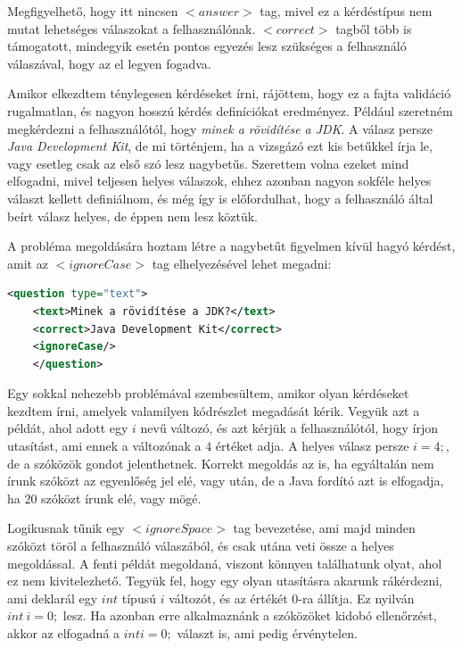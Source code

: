 \documentclass[12pt,a4paper]{article}
\begin{document}
	\noindent
	Megfigyelhető, hogy itt nincsen $<answer>$ tag, mivel ez a kérdéstípus nem mutat lehetséges válaszokat a felhasználónak. $<correct>$ tagből több is támogatott, mindegyik esetén pontos egyezés lesz szükséges a felhasználó válaszával, hogy az el legyen fogadva.
	
	Amikor elkezdtem ténylegesen kérdéseket írni, rájöttem, hogy ez a fajta validáció rugalmatlan, és nagyon hosszú kérdés definíciókat eredményez. Például szeretném megkérdezni a felhasználótól, hogy \textit{minek a rövidítése a JDK}. A válasz persze \textit{Java Development Kit}, de mi történjem, ha a vizsgázó ezt kis betűkkel írja le, vagy esetleg csak az első szó lesz nagybetűs. Szerettem volna ezeket mind elfogadni, mivel teljesen helyes válaszok, ehhez azonban nagyon sokféle helyes választ kellett definiálnom, és még így is előfordulhat, hogy a felhasználó által beírt válasz helyes, de éppen nem lesz köztük.
	
	A probléma megoldására hoztam létre a nagybetűt figyelmen kívül hagyó kérdést, amit az $<ignoreCase>$ tag elhelyezésével lehet megadni:
	
	\begin{lstlisting}[language=XML]	
	<question type="text">
	<text>Minek a rövidítése a JDK?</text>
	<correct>Java Development Kit</correct>
	<ignoreCase/>
	</question>
	\end{lstlisting}
	
	\noindent
	Egy sokkal nehezebb problémával szembesültem, amikor olyan kérdéseket kezdtem írni, amelyek valamilyen kódrészlet megadását kérik. Vegyük azt a példát, ahol adott egy $i$ nevű változó, és azt kérjük a felhasználótól, hogy írjon utasítást, ami ennek a változónak a $4$ értéket adja. A helyes válasz persze $i = 4;$, de a szóközök gondot jelenthetnek. Korrekt megoldás az is, ha egyáltalán nem írunk szóközt az egyenlőség jel elé, vagy után, de a Java fordító azt is elfogadja, ha 20 szóközt írunk elé, vagy mögé.
	
	Logikusnak tűnik egy $<ignoreSpace>$ tag bevezetése, ami majd minden szóközt töröl a felhasználó válaszából, és csak utána veti össze a helyes megoldással. A fenti példát megoldaná, viszont könnyen találhatunk olyat, ahol ez nem kivitelezhető. Tegyük fel, hogy egy olyan utasításra akarunk rákérdezni, ami deklarál egy $int$ típusú $i$ változót, és az értékét $0$-ra állítja. Ez nyilván $int \ i = 0;$ lesz. Ha azonban erre alkalmaznánk a szóközöket kidobó ellenőrzést, akkor az elfogadná a $inti=0;$ választ is, ami pedig érvénytelen.
	
\end{document}

